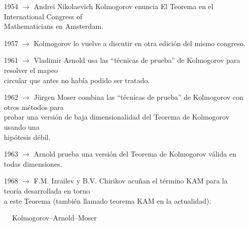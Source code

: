 \documentclass[8pt]{beamer}
\renewcommand{\>}{\rangle}
\newcommand{\<}{\langle}
\begin{document}
\begin{frame}
{}
\vspace{-5cm}

\begin{itemize}
\pause
\item[1954] $\longrightarrow$ Andre\"i Nikolaevich Kolmogorov enuncia El Teorema en el International Congress of \\ \hspace{13pt} Mathematicians en Amsterdam. \pause
\item[1957] $\longrightarrow$ Kolmogorov lo vuelve a discutir en otra edición del mismo congreso.
\pause
\item[1961] $\longrightarrow$ Vladimir Arnold usa las ``técnicas de prueba'' de Kolmogorov para resolver el mapeo \\ \hspace{13pt} circular que antes no había podido ser tratado.
\pause
\item[1962] $\longrightarrow$ J\"urgen Moser combina las ``técnicas de prueba'' de Kolmogorov con otros métodos para \\ \hspace{13pt} probar una versión de baja dimensionalidad del Teorema de Kolmogorov usando una \\ \hspace{13pt} hipótesis débil.
\pause
\item[1963] $\longrightarrow$ Arnold prueba una versión del Teorema de Kolmogorov válida en todas dimensiones.
\pause
\item[1968] $\longrightarrow$ F.M. Izrailev y B.V. Chirikov acuñan el término KAM para la teoría desarrollada en torno \\ \hspace{13pt} a este Teorema (también llamado teorema KAM en la actualidad). 
\end{itemize}
\pause
\begin{figure}[b]
\caption{Kolmogorov--Arnold--Moser}
\end{figure}


\vspace{-8cm}
\end{frame}
\end{document}
